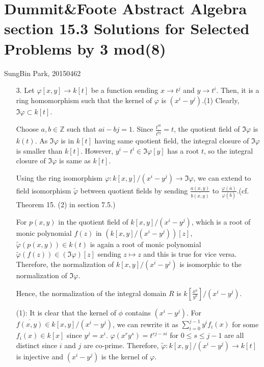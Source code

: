 \documentclass[12pt]{article}
\begin{document}
\section*{Dummit\&Foote Abstract Algebra section 15.3 Solutions for Selected Problems by 3 mod(8)}
SungBin Park, 20150462
\begin{enumerate}
\item[3.] Let $\varphi[x,y]\rightarrow k[t]$ be a function sending $x\rightarrow t^j$ and $y\rightarrow t^i$. Then, it is a ring homomorphism such that the kernel of $\varphi$ is $(x^i-y^j)$.(1) Clearly, $\Im \varphi\subset k[t]$.

Choose $a,b\in \mathbb{Z}$ such that $ai-bj=1$. Since $\frac{t^{ai}}{t^{bj}}=t$, the quotient field of $\Im \varphi$ is $k(t)$. As $\Im\varphi$ is in $k[t]$ having same quotient field, the integral closure of $\Im\varphi$ is smaller than $k[t]$. However, $y^i-t^i\in \Im\varphi[y]$ has a root $t$, so the integral closure of $\Im\varphi$ is same as $k[t]$.

Using the ring isomorphism $\varphi:k[x,y]/(x^i-y^j)\rightarrow \Im\varphi$, we can extend to field isomorphism $\tilde{\varphi}$ between quotient fields by sending $\frac{\overline{a(x,y)}}{\overline{b(x,y)}}$ to $\frac{\varphi(\overline{a})}{\varphi(\overline{b})}$.(cf. Theorem 15. (2) in section 7.5.)

For $p(x,y)$ in the quotient field of $k[x,y]/(x^i-y^j)$, which is a root of monic polynomial $f(z)$ in $\left(k[x,y]/(x^i-y^j)\right)[z]$, $\tilde{\varphi}(p(x,y))\in k(t)$ is again a root of monic polynomial $\tilde{\varphi}(f(z))\in \left(\Im \varphi\right)[z]$ sending $z\mapsto z$ and this is true for vice versa. Therefore, the normalization of $k[x,y]/(x^i-y^j)$ is isomorphic to the normalization of $\Im\varphi$.

Hence, the normalization of the integral domain $R$ is $k\left[\frac{x^{a}}{y^{b}}\right]/(x^i-y^j)$.

(1): It is clear that the kernel of $\phi$ contains $(x^i-y^j)$. For $\overline{f(x,y)}\in k[x,y]/(x^i-y^j)$, we can rewrite it as $\sum\limits_{i=0}^{j-1} y^i f_i(x)$ for some $f_i(x)\in k[x]$ since $y^j=x^i$. $\varphi(x^r y^s)=t^{rj-si}$ for $0\leq s\leq j-1$ are all distinct since $i$ and $j$ are co-prime. Therefore, $\tilde{\varphi}:k[x,y]/(x^i-y^j)\rightarrow k[t]$ is injective and $(x^i-y^j)$ is the kernel of $\varphi$.
\newpage



\end{enumerate}
\end{document}
